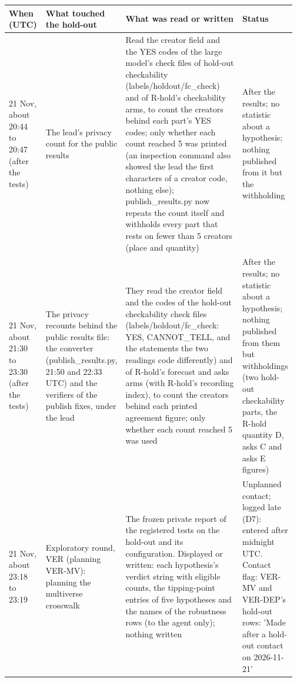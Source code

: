 {\scriptsize\setlength{\tabcolsep}{2pt}
\begin{tabular}{@{}p{0.13\linewidth}p{0.22\linewidth}p{0.44\linewidth}p{0.18\linewidth}@{}}
\toprule
When (UTC) & What touched the hold-out & What was read or written & Status \\
\midrule
21 Nov, about 20:44 to 20:47 (after the tests) & The lead's privacy count for the public results & Read the creator field and the YES codes of the large model's check files of hold-out checkability (labels/holdout/fc\_check) and of R-hold's checkability arms, to count the creators behind each part's YES codes; only whether each count reached 5 was printed (an inspection command also showed the lead the first characters of a creator code, nothing else); publish\_results.py now repeats the count itself and withholds every part that rests on fewer than 5 creators (place and quantity) & After the results; no statistic about a hypothesis; nothing published from it but the withholding \\
21 Nov, about 21:30 to 23:30 (after the tests) & The privacy recounts behind the public results file: the converter (publish\_results.py, 21:50 and 22:33 UTC) and the verifiers of the publish fixes, under the lead & They read the creator field and the codes of the hold-out checkability check files (labels/holdout/fc\_check: YES, CANNOT\_TELL, and the statements the two readings code differently) and of R-hold's forecast and asks arms (with R-hold's recording index), to count the creators behind each printed agreement figure; only whether each count reached 5 was used & After the results; no statistic about a hypothesis; nothing published from them but withholdings (two hold-out checkability parts, the R-hold quantity D, asks C and asks E figures) \\
21 Nov, about 23:18 to 23:19 & Exploratory round, VER (planning VER-MV): planning the multiverse crosswalk & The frozen private report of the registered tests on the hold-out and its configuration. Displayed or written: each hypothesis's verdict string with eligible counts, the tipping-point entries of five hypotheses and the names of the robustness rows (to the agent only); nothing written & Unplanned contact; logged late (D7): entered after midnight UTC. Contact flag: VER-MV and VER-DEP's hold-out rows: 'Made after a hold-out contact on 2026-11-21' \\

\end{tabular}}
